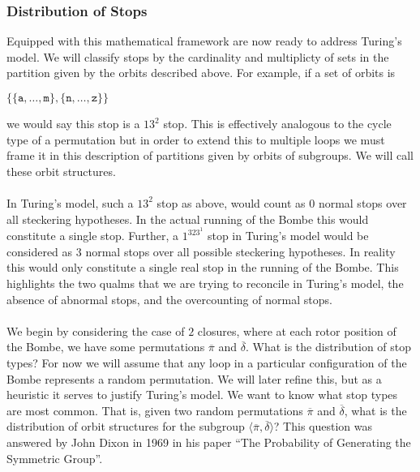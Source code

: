 \subsubsection{Distribution of Stops}
Equipped with this mathematical framework are now ready to address Turing's model. We will classify stops by the cardinality and multiplicty of sets in the partition given by the orbits described above. For example, if a set of orbits is
\begin{center}
	$\{\{\texttt{a}, \dots, \texttt{m}\}, \{\texttt{n}, \dots, \texttt{z}\}\}$
\end{center}
we would say this stop is a $13^2$ stop. This is effectively analogous to the cycle type of a permutation but in order to extend this to multiple loops we must frame it in this description of partitions given by orbits of subgroups. We will call these orbit structures.
\\\\In Turing's model, such a $13^2$ stop as above, would count as $0$ normal stops over all steckering hypotheses. In the actual running of the Bombe this would constitute a single stop. Further, a $1^323^1$ stop in Turing's model would be considered as $3$ normal stops over all possible steckering hypotheses. In reality this would only constitute a single real stop in the running of the Bombe. This highlights the two qualms that we are trying to reconcile in Turing's model, the absence of abnormal stops, and the overcounting of normal stops.
\\\\We begin by considering the case of $2$ closures, where at each rotor position of the Bombe, we have some permutations $\overline\pi$ and $\overline\delta$. What is the distribution of stop types? For now we will assume that any loop in a particular configuration of the Bombe represents a random permutation. We will later refine this, but as a heuristic it serves to justify Turing's model. We want to know what stop types are most common. That is, given two random permutations $\overline\pi$ and $\overline\delta$, what is the distribution of orbit structures for the subgroup $\langle\overline\pi, \overline\delta\rangle$? This question was answered by John Dixon in 1969 in his paper ``The Probability of Generating the Symmetric Group''.

